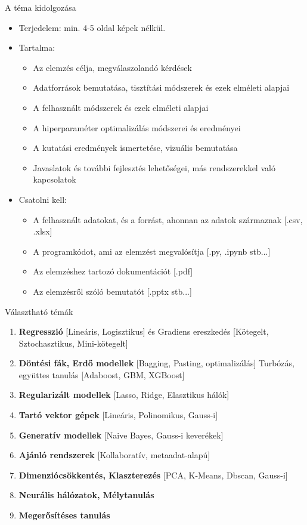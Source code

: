 \documentclass[english, aspectratio=169]{beamer}
\begin{document}
\begin{frame}{A téma kidolgozása}
\begin{itemize}
	\item Terjedelem: min. 4-5 oldal képek nélkül.\par\smallskip
	\item Tartalma:
	\begin{itemize}
		\item Az elemzés célja, megválaszolandó kérdések
		\item Adatforrások bemutatása, tisztítási módszerek és ezek elméleti alapjai
		\item A felhasznált módszerek és ezek elméleti alapjai
		\item A hiperparaméter optimalizálás módszerei és eredményei
		\item A kutatási eredmények ismertetése, vizuális bemutatása
		\item Javaslatok és további fejlesztés lehetőségei, más rendszerekkel való kapcsolatok
	\end{itemize}\par\smallskip
	\item Csatolni kell:
	\begin{itemize}
		\item A felhasznált adatokat, és a forrást, ahonnan az adatok származnak [.csv, .xlsx]
		\item A programkódot, ami az elemzést megvalósítja [.py, .ipynb stb...]
		\item Az elemzéshez tartozó dokumentációt [.pdf]
		\item Az elemzésről szóló bemutatót [.pptx stb...]
	\end{itemize}
\end{itemize}
\end{frame}

\begin{frame}{Választható témák}
\begin{enumerate}
	\item \textbf{Regresszió} [Lineáris, Logisztikus] és Gradiens ereszkedés [Kötegelt, Sztochasztikus, Mini-kötegelt]
	\item \textbf{Döntési fák, Erdő modellek} [Bagging, Pasting, optimalizálás] Turbózás, együttes tanulás [Adaboost, GBM, XGBoost]
	\item \textbf{Regularizált modellek} [Lasso, Ridge, Elasztikus hálók]
	\item \textbf{Tartó vektor gépek} [Lineáris, Polinomikus, Gauss-i]
	\item \textbf{Generatív modellek} [Naive Bayes, Gauss-i keverékek]
	\item \textbf{Ajánló rendszerek} [Kollaboratív, metaadat-alapú]
	\item \textbf{Dimenziócsökkentés, Klaszterezés} [PCA, K-Means, Dbscan, Gauss-i]
	\item \textbf{Neurális hálózatok, Mélytanulás}
	\item \textbf{Megerősítéses tanulás}
\end{enumerate}
\end{frame}
\end{document}
